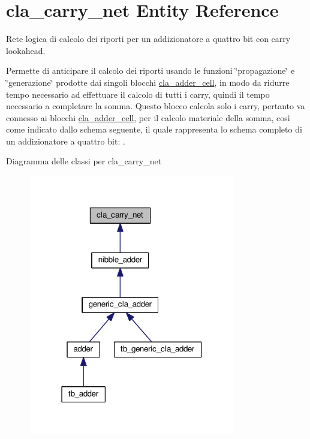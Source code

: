 \hypertarget{classcla__carry__net}{\section{cla\+\_\+carry\+\_\+net Entity Reference}
\label{classcla__carry__net}
}


Rete logica di calcolo dei riporti per un addizionatore a quattro bit con carry lookahead.

Permette di anticipare il calcolo dei riporti usando le funzioni \char`\"{}propagazione\char`\"{} e \char`\"{}generazione\char`\"{} prodotte dai singoli blocchi \hyperlink{classcla__adder__cell}{cla\+\_\+adder\+\_\+cell}, in modo da ridurre tempo necessario ad effettuare il calcolo di tutti i carry, quindi il tempo necessario a completare la somma. Questo blocco calcola solo i carry, pertanto va connesso ai blocchi \hyperlink{classcla__adder__cell}{cla\+\_\+adder\+\_\+cell}, per il calcolo materiale della somma, così come indicato dallo schema seguente, il quale rappresenta lo schema completo di un addizionatore a quattro bit\+: .  




Diagramma delle classi per cla\+\_\+carry\+\_\+net
\nopagebreak
\begin{figure}[H]
\begin{center}
\leavevmode
\includegraphics[width=255pt]{classcla__carry__net__inherit__graph}
\end{center}
\end{figure}
